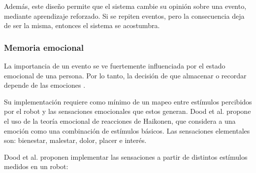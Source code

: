 




Además, este diseño permite que el sistema cambie su opinión sobre una evento, mediante aprendizaje reforzado. Si se repiten eventos, pero la consecuencia deja de ser la misma, entonces el sistema se acostumbra.

%

%



\subsubsection{Memoria emocional}
La importancia de un evento se ve fuertemente influenciada por el estado emocional de una persona. Por lo tanto, la decisión de que almacenar o recordar depende de las emociones \cite{Deutsch2008}.

Su implementación requiere como mínimo de un mapeo entre estímulos percibidos por el robot y las sensaciones emocionales que estos generan. Dood et al. \cite{Dodd2005} propone el uso de la teoría emocional de reacciones de Haikonen, que considera a una emoción como una combinación de estímulos básicos. Las sensaciones elementales son: bienestar, malestar, dolor, placer e interés.

Dood et al. proponen implementar las sensaciones a partir de distintos estímulos medidos en un robot:

